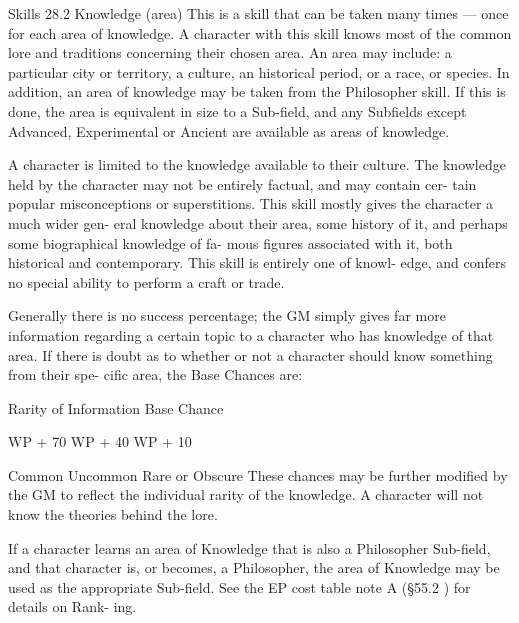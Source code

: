 \begin{Chapter}{Skills}
28.2 Knowledge (area) 
This is a skill that can be taken many times — once 
for  each  area  of  knowledge.  A  character  with  this 
skill knows most of the common lore and traditions 
concerning their chosen area. An area may include: 
a particular city or territory, a culture, an historical 
period, or a race, or species. In addition, an area of 
knowledge  may  be  taken  from  the  Philosopher 
skill. If this is done, the area is equivalent in size to 
a  Sub-field,  and  any  Subfields  except  Advanced, 
Experimental  or  Ancient  are  available  as  areas  of 
knowledge. 

A character is limited to the knowledge available to 
their culture. The knowledge held by the character 
may  not  be  entirely  factual,  and  may  contain  cer-
tain  popular  misconceptions  or  superstitions.  This 
skill mostly gives the character a much wider gen-
eral knowledge about their area, some history of it, 
and  perhaps  some  biographical  knowledge  of  fa-
mous figures associated with it, both historical and 
contemporary.  This  skill  is  entirely  one  of  knowl-
edge,  and  confers  no  special  ability  to  perform  a 
craft or trade. 

Generally  there  is  no  success  percentage;  the  GM 
simply  gives  far  more  information  regarding  a 
certain  topic  to  a  character  who  has  knowledge  of 
that  area.  If  there  is  doubt  as  to  whether  or  not  a 
character  should  know  something  from  their  spe-
cific area, the Base Chances are: 

Rarity of Information  Base Chance  

WP + 70%
WP + 40%
WP + 10%

Common 
Uncommon 
Rare or Obscure 
These chances may be further modified by the GM 
to reflect the individual rarity of the knowledge. A 
character  will  not  know  the  theories  behind  the 
lore. 

If  a  character  learns  an  area  of  Knowledge  that  is 
also a Philosopher Sub-field, and that character is, 
or becomes, a Philosopher, the area of Knowledge 
may  be  used  as  the  appropriate  Sub-field.  See  the 
EP cost table note  A (§55.2 ) for details on Rank-
ing. 

\end{Chapter}
